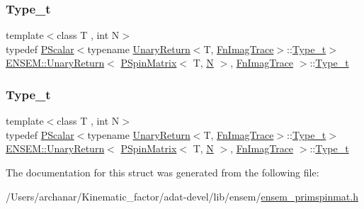 \subsubsection{\texorpdfstring{Type\_t}{Type\_t}\hspace{0.1cm}{\footnotesize\ttfamily [2/3]}}
{\footnotesize\ttfamily template$<$class T , int N$>$ \\
typedef \mbox{\hyperlink{classENSEM_1_1PScalar}{P\+Scalar}}$<$typename \mbox{\hyperlink{structENSEM_1_1UnaryReturn}{Unary\+Return}}$<$T, \mbox{\hyperlink{structENSEM_1_1FnImagTrace}{Fn\+Imag\+Trace}}$>$\+::\mbox{\hyperlink{structENSEM_1_1UnaryReturn_3_01PSpinMatrix_3_01T_00_01N_01_4_00_01FnImagTrace_01_4_a00df9fe56fd651d15305a76596a3f23b}{Type\+\_\+t}}$>$ \mbox{\hyperlink{structENSEM_1_1UnaryReturn}{E\+N\+S\+E\+M\+::\+Unary\+Return}}$<$ \mbox{\hyperlink{classENSEM_1_1PSpinMatrix}{P\+Spin\+Matrix}}$<$ T, \mbox{\hyperlink{adat__devel_2lib_2hadron_2operator__name__util_8cc_a7722c8ecbb62d99aee7ce68b1752f337}{N}} $>$, \mbox{\hyperlink{structENSEM_1_1FnImagTrace}{Fn\+Imag\+Trace}} $>$\+::\mbox{\hyperlink{structENSEM_1_1UnaryReturn_3_01PSpinMatrix_3_01T_00_01N_01_4_00_01FnImagTrace_01_4_a00df9fe56fd651d15305a76596a3f23b}{Type\+\_\+t}}}

\mbox{\label{structENSEM_1_1UnaryReturn_3_01PSpinMatrix_3_01T_00_01N_01_4_00_01FnImagTrace_01_4_a00df9fe56fd651d15305a76596a3f23b}} 
\subsubsection{\texorpdfstring{Type\_t}{Type\_t}\hspace{0.1cm}{\footnotesize\ttfamily [3/3]}}
{\footnotesize\ttfamily template$<$class T , int N$>$ \\
typedef \mbox{\hyperlink{classENSEM_1_1PScalar}{P\+Scalar}}$<$typename \mbox{\hyperlink{structENSEM_1_1UnaryReturn}{Unary\+Return}}$<$T, \mbox{\hyperlink{structENSEM_1_1FnImagTrace}{Fn\+Imag\+Trace}}$>$\+::\mbox{\hyperlink{structENSEM_1_1UnaryReturn_3_01PSpinMatrix_3_01T_00_01N_01_4_00_01FnImagTrace_01_4_a00df9fe56fd651d15305a76596a3f23b}{Type\+\_\+t}}$>$ \mbox{\hyperlink{structENSEM_1_1UnaryReturn}{E\+N\+S\+E\+M\+::\+Unary\+Return}}$<$ \mbox{\hyperlink{classENSEM_1_1PSpinMatrix}{P\+Spin\+Matrix}}$<$ T, \mbox{\hyperlink{adat__devel_2lib_2hadron_2operator__name__util_8cc_a7722c8ecbb62d99aee7ce68b1752f337}{N}} $>$, \mbox{\hyperlink{structENSEM_1_1FnImagTrace}{Fn\+Imag\+Trace}} $>$\+::\mbox{\hyperlink{structENSEM_1_1UnaryReturn_3_01PSpinMatrix_3_01T_00_01N_01_4_00_01FnImagTrace_01_4_a00df9fe56fd651d15305a76596a3f23b}{Type\+\_\+t}}}



The documentation for this struct was generated from the following file\+:\begin{DoxyCompactItemize}
\item 
/\+Users/archanar/\+Kinematic\+\_\+factor/adat-\/devel/lib/ensem/\mbox{\hyperlink{adat-devel_2lib_2ensem_2ensem__primspinmat_8h}{ensem\+\_\+primspinmat.\+h}}\end{DoxyCompactItemize}
